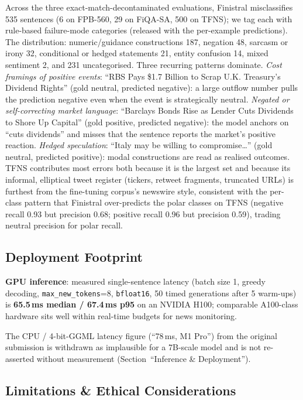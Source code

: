 \documentclass[a4paper]{article}
\begin{document}
Across the three exact-match-decontaminated evaluations, Finistral misclassifies 535 sentences (6 on FPB-560, 29 on FiQA-SA, 500 on TFNS); we tag each with rule-based failure-mode categories (released with the per-example predictions). The distribution: numeric/guidance constructions 187, negation 48, sarcasm or irony 32, conditional or hedged statements 21, entity confusion 14, mixed sentiment 2, and 231 uncategorised. Three recurring patterns dominate. \emph{Cost framings of positive events}: ``RBS Pays \$1.7 Billion to Scrap U.K. Treasury's Dividend Rights'' (gold neutral, predicted negative): a large outflow number pulls the prediction negative even when the event is strategically neutral. \emph{Negated or self-correcting market language}: ``Barclays Bonds Rise as Lender Cuts Dividends to Shore Up Capital'' (gold positive, predicted negative): the model anchors on ``cuts dividends'' and misses that the sentence reports the market's positive reaction. \emph{Hedged speculation}: ``Italy may be willing to compromise\ldots'' (gold neutral, predicted positive): modal constructions are read as realised outcomes. TFNS contributes most errors both because it is the largest set and because its informal, elliptical tweet register (tickers, retweet fragments, truncated URLs) is furthest from the fine-tuning corpus's newswire style, consistent with the per-class pattern that Finistral over-predicts the polar classes on TFNS (negative recall 0.93 but precision 0.68; positive recall 0.96 but precision 0.59), trading neutral precision for polar recall.

\subsection{Deployment Footprint}

\textbf{GPU inference}: measured single-sentence latency (batch size 1, greedy decoding, \texttt{max\_new\_tokens}=8, \texttt{bfloat16}, 50 timed generations after 5 warm-ups) is \textbf{65.5\,ms median / 67.4\,ms p95} on an NVIDIA H100; comparable A100-class hardware sits well within real-time budgets for news monitoring.

The CPU / 4-bit-GGML latency figure (``78\,ms, M1 Pro'') from the original submission is withdrawn as implausible for a 7B-scale model and is not re-asserted without measurement (Section~``Inference \& Deployment'').

\subsection{Limitations \& Ethical Considerations}
\end{document}
